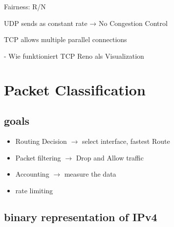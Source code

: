 \documentclass{article}
\begin{document}
    Fairness:
    R/N
    
    UDP sends as constant rate → No Congestion Control
    
    TCP allows multiple parallel connections


    - Wie funktioniert TCP Reno als Visualization

    \section{Packet Classification}

    \subsection{goals}

    \begin{itemize}
        \item Routing Decision $\rightarrow{}$ select interface, fastest Route
        \item Packet filtering $\rightarrow{}$ Drop and Allow traffic
        \item Accounting $\rightarrow{}$ measure the data
        \item rate limiting
    \end{itemize}

    \subsection{binary representation of IPv4}

\end{document}

